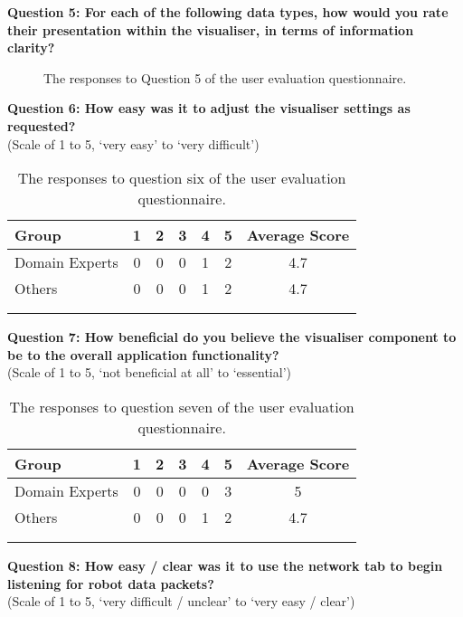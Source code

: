 \clearpage
\noindent\textbf{Question 5: For each of the following data types, how would you rate their presentation within the visualiser, in terms of information clarity?}

\begin{figure}[h]
	\centering
	\decoRule
	\caption[User Evaluation Question 5 Responses]{The responses to Question 5 of the user evaluation questionnaire.}
	\label{fig:VisualisationLikert}
\end{figure}

\noindent\textbf{Question 6: How easy was it to adjust the visualiser settings as requested?}\\(Scale of 1 to 5, `very easy' to `very difficult')

\begin{longtable}{ l c c c c c c }
 \textbf{Group} & \textbf{1} & \textbf{2} & \textbf{3} & \textbf{4} & \textbf{5} & \textbf{Average Score} \\ 
 \hline
 Domain Experts & 0 & 0 & 0 & 1 & 2 & 4.7 \\
 Others 		& 0 & 0 & 0 & 1 & 2 & 4.7 \\
 \bottomrule
\caption[User Evaluation Question 6 Responses]{The responses to question six of the user evaluation questionnaire.}\\
\label{tab:EvaluationQuestionSix}
\end{longtable}

\noindent\textbf{Question 7: How beneficial do you believe the visualiser component to be to the overall application functionality?}\\(Scale of 1 to 5, `not beneficial at all' to `essential')

\begin{longtable}{ l c c c c c c }
 \textbf{Group} & \textbf{1} & \textbf{2} & \textbf{3} & \textbf{4} & \textbf{5} & \textbf{Average Score} \\ 
 \hline
 Domain Experts & 0 & 0 & 0 & 0 & 3 & 5 \\
 Others 		& 0 & 0 & 0 & 1 & 2 & 4.7 \\
 \bottomrule
\caption[User Evaluation Question 7 Responses]{The responses to question seven of the user evaluation questionnaire.}\\
\label{tab:EvaluationQuestionSeven}
\end{longtable}

\noindent\textbf{Question 8: How easy / clear was it to use the network tab to begin listening for robot data packets?}\\(Scale of 1 to 5, `very difficult / unclear' to `very easy / clear')

